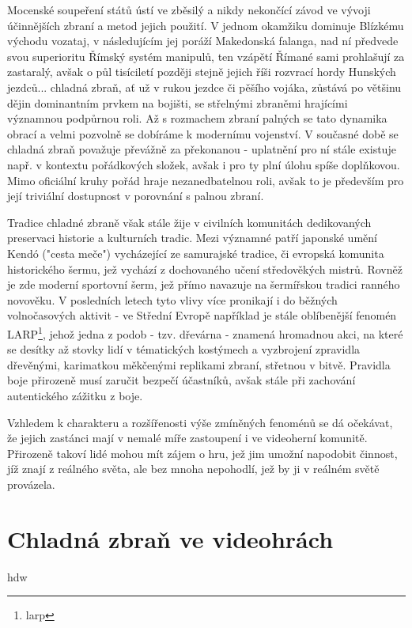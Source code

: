 Mocenské soupeření států ústí ve zběsilý a nikdy nekončící závod ve vývoji účinnějších zbraní a metod jejich použití. V jednom okamžiku dominuje Blízkému východu vozataj, v následujícím jej poráží Makedonská falanga, nad ní předvede svou superioritu Římský systém manipulů, ten vzápětí Římané sami prohlašují za zastaralý, avšak o půl tisíciletí později stejně jejich říši rozvrací hordy Hunských jezdců... chladná zbraň, ať už v rukou jezdce či pěšího vojáka, zůstává po většinu dějin dominantním prvkem na bojišti, se střelnými zbraněmi hrajícími významnou podpůrnou roli. Až s rozmachem zbraní palných se tato dynamika obrací a velmi pozvolně se dobíráme k modernímu vojenství. V současné době se chladná zbraň považuje převážně za překonanou - uplatnění pro ní stále existuje např. v kontextu pořádkových složek, avšak i pro ty plní úlohu spíše doplňkovou. Mimo oficiální kruhy pořád hraje nezanedbatelnou roli, avšak to je především pro její triviální dostupnost v porovnání s palnou zbraní.

Tradice chladné zbraně však stále žije v civilních komunitách dedikovaných preservaci historie a kulturních tradic. Mezi významné patří japonské umění Kendó ("cesta meče") vycházející ze samurajské tradice, či evropská komunita historického šermu, jež vychází z dochovaného učení středověkých mistrů. Rovněž je zde moderní sportovní šerm, jež přímo navazuje na šermířskou tradici ranného novověku. V posledních letech tyto vlivy více pronikají i do běžných volnočasových aktivit - ve Střední Evropě například je stále oblíbenější fenomén LARP\footnote{\ac{larp}}, jehož jedna z podob - tzv. dřevárna - znamená hromadnou akci, na které se desítky až stovky lidí v tématických kostýmech a vyzbrojení zpravidla dřevěnými, karimatkou měkčenými replikami zbraní, střetnou v bitvě. Pravidla boje přirozeně musí zaručit bezpečí účastníků, avšak stále při zachování autentického zážitku z boje.  

Vzhledem k charakteru a rozšířenosti výše zmíněných fenoménů se dá očekávat, že jejich zastánci mají v nemalé míře zastoupení i ve videoherní komunitě. Přirozeně takoví lidé mohou mít zájem o hru, jež jim umožní napodobit činnost, jíž znají z reálného světa, ale bez mnoha nepohodlí, jež by ji v reálném světě provázela.



\section{Chladná zbraň ve videohrách}
hdw

